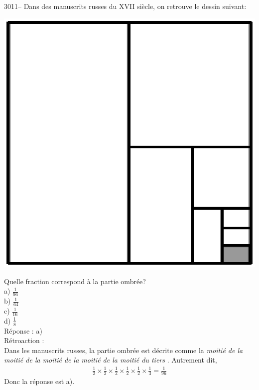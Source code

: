 \documentclass[letterpaper, 12pt]{article}
\begin{document}
3011-- Dans des manuscrits russes du {\scriptsize XVII\ieme{}} si\`ecle, on retrouve le dessin suivant:\\
\begin{center}
\includegraphics[scale=0.3]{carre_proportions.eps}
\end{center}
Quelle fraction  correspond \`a la partie ombr\'ee?\\

a) $\frac{1}{96}$\\[2mm]
b) $\frac{1}{64}$\\[2mm]
c) $\frac{1}{16}$\\[2mm]
d) $\frac{1}{8}$\\

R\'eponse : a)\\

R\'etroaction :\\
Dans les manuscrits russes, la partie ombr\'ee est d\'ecrite comme la \og \emph{moiti\'e de la moiti\'e de la moiti\'e de la moiti\'e de la moiti\'e du tiers} \fg. Autrement dit,
\begin{eqnarray*}
\frac{1}{2} \times \frac{1}{2} \times \frac{1}{2} \times \frac{1}{2} \times \frac{1}{2} \times \frac{1}{3} = \frac{1}{96}
\end{eqnarray*}
Donc la r\'eponse est a).\\
\end{document}
